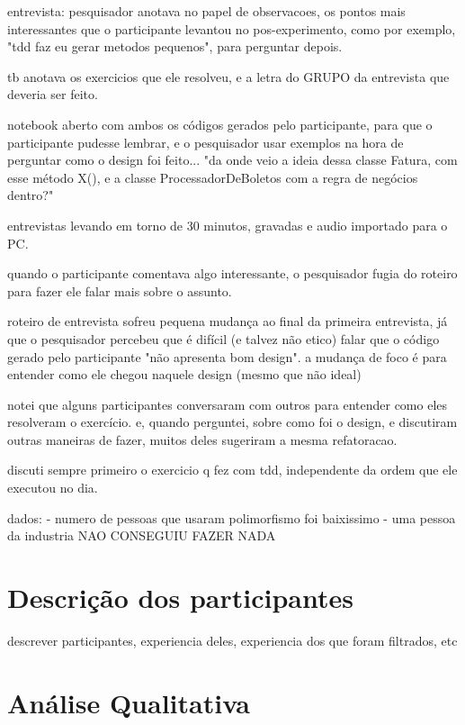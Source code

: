 entrevista:
pesquisador anotava no papel de observacoes, os pontos mais interessantes que o participante levantou no pos-experimento,
como por exemplo, "tdd faz eu gerar metodos pequenos", para perguntar depois.

tb anotava os exercicios que ele resolveu, e a letra do GRUPO da entrevista que deveria ser feito.

notebook aberto com ambos os códigos gerados pelo participante, para que o participante pudesse lembrar,
e o pesquisador usar exemplos na hora de perguntar como o design foi feito... "da onde veio a ideia dessa classe
Fatura, com esse método X(), e a classe ProcessadorDeBoletos com a regra de negócios dentro?"

entrevistas levando em torno de 30 minutos, gravadas e audio importado para o PC.

quando o participante comentava algo interessante, o pesquisador fugia do roteiro para fazer ele falar mais sobre o assunto.

roteiro de entrevista sofreu pequena mudança ao final da primeira entrevista, já que o pesquisador percebeu que
é difícil (e talvez não etico) falar que o código gerado pelo participante "não apresenta bom design". a mudança de foco
é para entender como ele chegou naquele design (mesmo que não ideal)

notei que alguns participantes conversaram com outros para entender como eles resolveram o exercício. e, quando perguntei,
sobre como foi o design, e discutiram outras maneiras de fazer, muitos deles sugeriram a mesma refatoracao.

discuti sempre primeiro o exercicio q fez com tdd, independente da ordem que
ele executou no dia.

dados:
- numero de pessoas que usaram polimorfismo foi baixissimo
- uma pessoa da industria NAO CONSEGUIU FAZER NADA


\section{Descrição dos participantes}

descrever participantes, experiencia deles, experiencia dos que foram filtrados, etc

\section{Análise Qualitativa}

